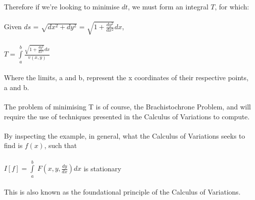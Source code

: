 \documentclass[12pt]{report}
\begin{document}
\\
\\
Therefore if we're looking to minimise \(dt\), we must form an integral \(T\), for which:
\\
\\
Given \(ds\) = \(\sqrt{dx^2 + dy^2}\) = \(\sqrt{1 + \frac{dy^2}{dx^2}} dx\),
\\
\\
\(T=\int\limits_a^b\frac{\sqrt{1 + \frac{dy^2}{dx^2}}dx}{v(x,y)}\)
\\
\\
Where the limits, a and b, represent the x coordinates of their respective points, a and b.
\\
\\
The problem of minimising T is of course, the Brachistochrone Problem, and will require the use of techniques presented in the Calculus of Variations to compute.
\\
\\
By inspecting the example, in general, what the Calculus of Variations seeks to find is \(f(x)\), such that
\\
\\
\(I[f] = \int\limits_a^b\ F(x, y, \frac{dy}{dx})dx\) is stationary
\\
\\
This is also known as the foundational principle of the Calculus of Variations.
\end{document}
